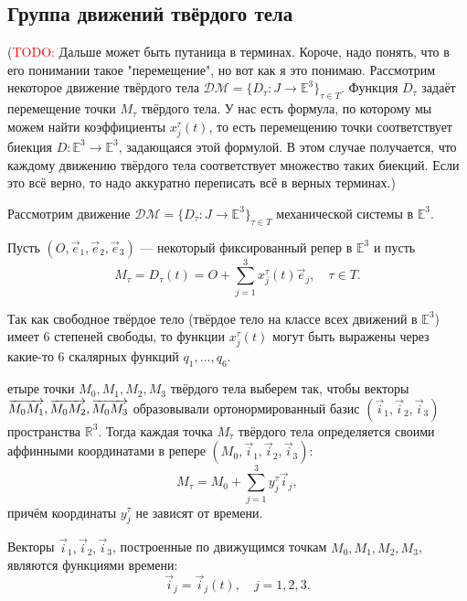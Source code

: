 \subsection{Группа движений твёрдого тела}

(\textcolor{red}{TODO:} Дальше может быть путаница в терминах. Короче, надо
понять, что в его понимании такое "перемещение", но вот как я это понимаю.
Рассмотрим некоторое движение твёрдого тела $\mathcal{DM} = \{ D_\tau : J \to
\mathbb{E}^3 \}_{\tau \in T}$. Функция $D_\tau$ задаёт перемещение точки
$M_\tau$ твёрдого тела. У нас есть формула, по которому мы можем найти
коэффициенты $x_j^\tau(t)$, то есть перемещению точки соответствует биекция
$D : \mathbb{E}^3 \to \mathbb{E}^3$, задающаяся этой формулой. В этом случае
получается, что каждому движению твёрдого тела соответствует множество таких
биекций. Если это всё верно, то надо аккуратно переписать всё в верных
терминах.)

Рассмотрим движение $\mathcal{DM} = \{ D_\tau : J \to \mathbb{E}^3 \}_{\tau \in
T}$ механической системы в $\mathbb{E}^3$.

Пусть $(O, \vec{e}_1, \vec{e}_2, \vec{e}_3)$ --- некоторый фиксированный репер в
$\mathbb{E}^3$ и пусть
\begin{equation}
  \label{eq:coords_in_immovable_frame}
  M_\tau = D_\tau(t) = O + \sum_{j=1}^{3} x_j^\tau(t) \vec{e}_j, \quad
    \tau \in T.
\end{equation}

Так как свободное твёрдое тело (твёрдое тело на классе всех движений в
$\mathbb{E}^3$) имеет 6 степеней свободы, то функции $x_j^\tau(t)$ могут быть
выражены через какие-то 6 скалярных функций $q_1, \dots, q_6$.

етыре точки $M_0, M_1, M_2, M_3$ твёрдого тела выберем так, чтобы векторы
$\overrightarrow{M_0 M_1}, \overrightarrow{M_0 M_2}, \overrightarrow{M_0 M_3}$ образовывали ортонормированный базис
$(\vec{i}_1, \vec{i}_2, \vec{i}_3)$ пространства $\mathbb{R}^3$. Тогда каждая
точка $M_\tau$ твёрдого тела определяется своими аффинными координатами в репере
$(M_0, \vec{i}_1, \vec{i}_2, \vec{i}_3)$:
\begin{equation}
  \label{eq:coords_in_movable_frame}
  M_\tau = M_0 + \sum_{j=1}^{3} y_j^\tau \vec{i}_j,
\end{equation}
причём координаты $y_j^\tau$ не зависят от времени.

Векторы $\vec{i}_1, \vec{i}_2, \vec{i}_3$, построенные по движущимся точкам
$M_0, M_1, M_2, M_3$, являются функциями времени:
\begin{equation*}
  \vec{i}_j = \vec{i}_j(t), \quad j = 1,2,3.
\end{equation*}

